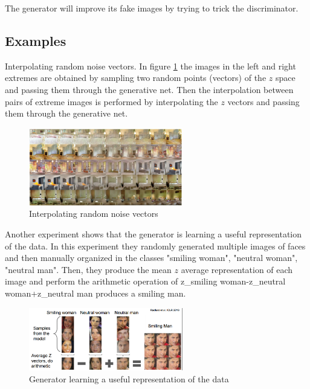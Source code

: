\documentclass{article}
\begin{document}
	The generator will improve its fake images by trying to trick the discriminator.
	
	
	
	\subsection{Examples}
	Interpolating random noise vectors. In figure \ref{fig:gans1} the images in the left and right extremes are obtained by sampling two random points (vectors) of the $z$ space and passing them through the generative net. Then the interpolation between pairs of extreme images is performed by interpolating the $z$ vectors and passing them through the generative net.
	\begin{figure}[!htb]
		\centering
		\includegraphics[width=0.6\textwidth]{Images/gans/9.png}
		\caption{Interpolating random noise vectors}
		\label{fig:gans1}
	\end{figure}
	
	Another experiment shows that the generator is learning a useful representation of the data. In this experiment they randomly generated multiple images of faces and then manually organized in the classes "smiling woman", "neutral woman", "neutral man". Then, they produce the mean $z$ average representation of each image and perform the arithmetic operation of z\_{smiling woman}-z\_{neutral woman}+z\_{neutral man} produces a smiling man.
	
	\begin{figure}[!htb]
		\centering
		\includegraphics[width=0.6\textwidth]{Images/gans/10.png}
		\caption{Generator learning a useful representation of the data}
	\end{figure}
\end{document}
